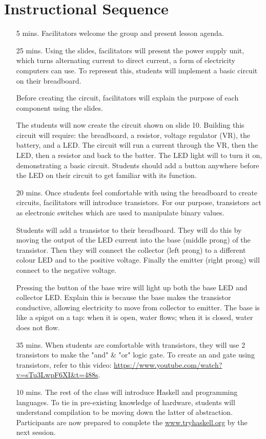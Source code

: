 \documentclass[11pt]{article}
\begin{document}
\section*{Instructional Sequence}

\begin{itemize}
  \item[5 mins.]
    Facilitators welcome the group and present lesson agenda.

  \item[25 mins.]
    Using the slides, facilitators will present the power supply unit, which
    turns alternating current to direct current, a form of electricity computers
    can use. To represent this, students will implement a basic circuit on their
    breadboard.

    Before creating the circuit, facilitators will explain the purpose of each
    component using the slides.

    The students will now create the circuit shown on slide 10. Building this circuit will require: the breadboard, a resistor, voltage
    regulator (VR), the battery, and a LED. The circuit will run a current through the VR, then the LED,
    then a resistor and back to the batter. The LED light will
    to turn it on, demonstrating a basic circuit. Students should add a button
    anywhere before the LED on their circuit to get familiar with its function.

  \item[20 mins.]
    Once students feel comfortable with using the breadboard to create
    circuits, facilitators will introduce transistors. For our purpose,
    transistors act as electronic switches which are used to manipulate binary
    values. 

    Students will add a transistor to their breadboard. They will do this by
    moving the output of the LED current into the base (middle prong) of the
    transistor. Then they will connect the collector (left prong) to a
    different colour LED and to the positive voltage. Finally the emitter
    (right prong) will connect to the negative voltage. 

    Pressing the button of the base wire will light up both the base LED and
    collector LED. Explain this is because the base makes the transistor
    conductive, allowing electricity to move from collector to emitter. The
    base is like a spigot on a tap: when it is open, water flows; when it is
    closed, water does not flow.

  \item[35 mins.]
    When students are comfortable with transistors, they will use 2 transistors
    to make the "and" \& "or" logic gate. To create an and gate using
    transistors, refer to this video:
    \url{https://www.youtube.com/watch?v=sTu3LwpF6XI&t=488s}.

  \item[10 mins.]
    The rest of the class will introduce Haskell and programming languages. To
    tie in pre-existing knowledge of hardware, students will understand
    compilation to be moving down the latter of abstraction. Participants are
    now prepared to complete the \url{www.tryhaskell.org} by the next session.
\end{itemize}
\end{document}
